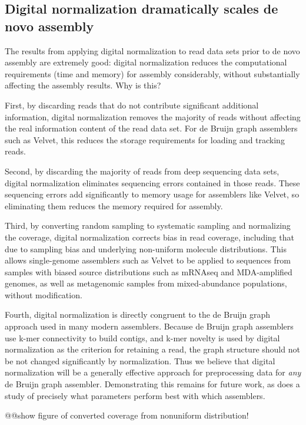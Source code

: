 \documentclass[10pt]{article}
\begin{document}
\subsection*{Digital normalization dramatically scales de novo assembly}

The results from applying digital normalization to read data sets
prior to de novo assembly are extremely good: digital normalization
reduces the computational requirements (time and memory) for assembly
considerably, without substantially affecting the assembly results.
Why is this?

First, by discarding reads that do not contribute significant
additional information, digital normalization removes the majority of
reads without affecting the real information content of the read data
set.  For de Bruijn graph assemblers such as Velvet, this reduces the
storage requirements for loading and tracking reads.

Second, by discarding the majority of reads from deep sequencing data
sets, digital normalization eliminates sequencing errors contained in
those reads.  These sequencing errors add significantly to memory
usage for assemblers like Velvet, so eliminating them reduces the
memory required for assembly.

Third, by converting random sampling to systematic sampling and
normalizing the coverage, digital normalization corrects bias in read
coverage, including that due to sampling bias and underlying
non-uniform molecule distributions.  This allows single-genome
assemblers such as Velvet to be applied to sequences from samples with
biased source distributions such as mRNAseq and MDA-amplified genomes,
as well as metagenomic samples from mixed-abundance populations,
without modification.

Fourth, digital normalization is directly congruent to the de Bruijn
graph approach used in many modern assemblers.  Because de Bruijn
graph assemblers use k-mer connectivity to build contigs, and k-mer
novelty is used by digital normalization as the criterion for
retaining a read, the graph structure should not be not changed
significantly by normalization.  Thus we believe that digital
normalization will be a generally effective approach for preprocessing
data for {\em any} de Bruijn graph assembler.  Demonstrating this
remains for future work, as does a study of precisely what parameters
perform best with which assemblers.

@@show figure of converted coverage from nonuniform distribution!
\end{document}

